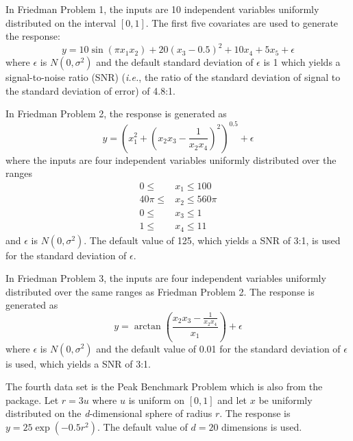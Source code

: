 In Friedman Problem 1, the inputs are 10 independent variables uniformly distributed on the interval $\left[0,1\right]$. The first five covariates are used to generate the response:
$$y = 10 \sin\left(\pi x_1 x_2\right) + 20 \left(x_3 - 0.5\right)^2 + 10 x_4 + 5 x_5 + \epsilon$$
where $\epsilon$ is $N\left(0,\sigma^2\right)$ and the default standard deviation of $\epsilon$ is 1 which yields a signal-to-noise ratio (SNR) (\emph{i.e.}, the ratio of the standard deviation of signal to the standard deviation of error) of 4.8:1.

In Friedman Problem 2, the response is generated as $$y = \left(x_1^2 + \left(x_2 x_3 - \frac{1}{x_2 x_4}\right)^2\right)^{0.5} + \epsilon$$ where the inputs are four independent variables uniformly distributed over the ranges 
\begin{align*}
    0 \leq &x_1 \leq 100 \\
    40 \pi \leq &x_2 \leq 560 \pi \\
    0 \leq &x_3 \leq 1\\
    1 \leq &x_4 \leq 11
\end{align*}
and $\epsilon$ is $N\left(0,\sigma^2\right)$. The default value of 125, which yields a SNR of 3:1, is used for the standard deviation of $\epsilon$.

In Friedman Problem 3, the inputs are four independent variables uniformly distributed over the same ranges as Friedman Problem 2. The response is generated as $$y = \arctan{\left(\frac{x_2 x_3 - \frac{1}{x_2 x_4}}{x_1}\right)} + \epsilon$$ where $\epsilon$ is $N\left(0,\sigma^2\right)$ and the default value of 0.01 for the standard deviation of $\epsilon$ is used, which yields a SNR of 3:1.

The fourth data set is the Peak Benchmark Problem which is also from the  package. Let $r=3u$ where $u$ is uniform on $\left[0,1\right]$ and let $x$ be uniformly distributed on the \emph{d}-dimensional sphere of radius $r$. The response is $y=25\exp\left(-0.5r^2\right)$. The default value of $d=20$ dimensions is used.

